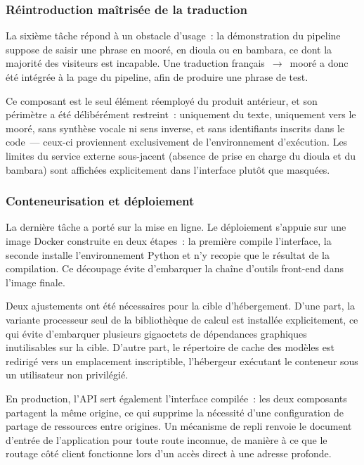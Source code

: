 \subsubsection{Réintroduction maîtrisée de la traduction}

La sixième tâche répond à un obstacle d'usage~: la démonstration du pipeline suppose de
saisir une phrase en mooré, en dioula ou en bambara, ce dont la majorité des visiteurs
est incapable. Une traduction français~$\rightarrow$~mooré a donc été intégrée à la
page du pipeline, afin de produire une phrase de test.

Ce composant est le seul élément réemployé du produit antérieur, et son périmètre a
été délibérément restreint~: uniquement du texte, uniquement vers le mooré, sans
synthèse vocale ni sens inverse, et sans identifiants inscrits dans le code~--- ceux-ci
proviennent exclusivement de l'environnement d'exécution. Les limites du service
externe sous-jacent (absence de prise en charge du dioula et du bambara) sont
affichées explicitement dans l'interface plutôt que masquées.

\subsubsection{Conteneurisation et déploiement}

La dernière tâche a porté sur la mise en ligne. Le déploiement s'appuie sur une image
Docker construite en deux étapes~: la première compile l'interface, la seconde
installe l'environnement Python et n'y recopie que le résultat de la compilation. Ce
découpage évite d'embarquer la chaîne d'outils front-end dans l'image finale.

Deux ajustements ont été nécessaires pour la cible d'hébergement. D'une part, la
variante processeur seul de la bibliothèque de calcul est installée explicitement, ce
qui évite d'embarquer plusieurs gigaoctets de dépendances graphiques inutilisables sur
la cible. D'autre part, le répertoire de cache des modèles est redirigé vers un
emplacement inscriptible, l'hébergeur exécutant le conteneur sous un utilisateur non
privilégié.

En production, l'API sert également l'interface compilée~: les deux composants
partagent la même origine, ce qui supprime la nécessité d'une configuration de partage
de ressources entre origines. Un mécanisme de repli renvoie le document d'entrée de
l'application pour toute route inconnue, de manière à ce que le routage côté client
fonctionne lors d'un accès direct à une adresse profonde.

